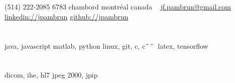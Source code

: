 \documentclass[print]{friggeri-cv}
\begin{document}

\newcommand{\eletr}{\href{http://www.etsmtl.ca/Programmes-Etudes/1er-cycle/Fiche-de-cours?Sigle=ELE747}{ele{\footnotesize747}}}
\newcommand{\eleenv}{\href{http://www.etsmtl.ca/Programmes-Etudes/1er-cycle/Fiche-de-cours?Sigle=ELE116}{ele{\footnotesize116}}}
\newcommand{\infmat}{\href{http://www.polymtl.ca/etudes/cours/details.php?sigle=INF1005a}{inf{\footnotesize1005}a}}
\newcommand{\gtssys}{\href{http://www.etsmtl.ca/Futurs-etudiants/Cycles-sup/Fiche-de-cours?Sigle=GTS840}{gts{\footnotesize840}}}

\begin{aside}
  \section{}
  {\small(514) 222-2085}
  {\small6783} chambord
  montréal
  canada
  ~
  \href{mailto:jf.pambrun@gmail.com}{jf.pambrun@gmail.com}
  \href{https://ca.linkedin.com/in/jpambrun}{linkedin://jpambrun}
  \href{http://github.com/jpambrun}{github://jpambrun}
  \section{}
  \section{}
  java, javascript
  matlab, python
  linux, git, c, c{\tiny$^{++}$}
  latex, tensorflow
  \section{}
  dicom, ihe, hl{\small7}
  jpeg {\small2000}, jpip

\end{aside}
\end{document}
